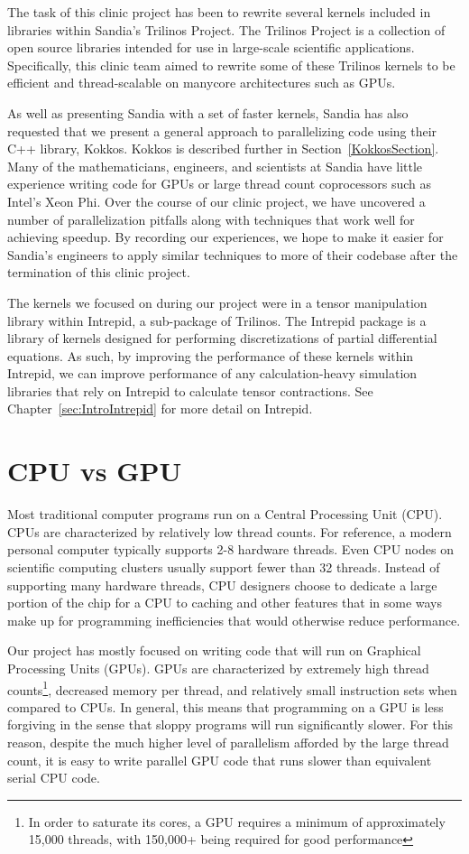 The task of this clinic project has been to rewrite several kernels included in
libraries within Sandia's Trilinos Project. The Trilinos Project is a
collection of open source libraries intended for use in large-scale scientific
applications. Specifically, this clinic team aimed to rewrite some of these Trilinos kernels to be
efficient and thread-scalable on manycore architectures such as GPUs.

As well as presenting Sandia with a set of faster kernels, Sandia has also
requested that we present a general approach to parallelizing code using their C++ library, Kokkos. Kokkos is described further in Section~\ref{KokkosSection}. Many of the
mathematicians, engineers, and scientists at Sandia have little experience
writing code for GPUs or large thread count coprocessors such as Intel's Xeon Phi. Over
the course of our clinic project, we have uncovered a number of parallelization pitfalls 
along with techniques that work well for achieving speedup. By recording our experiences, we hope to
make it easier for Sandia's engineers to apply similar techniques to more of
their codebase after the termination of this clinic project.

The kernels we focused on during our project were in a tensor manipulation
library within Intrepid, a sub-package of Trilinos. The Intrepid package is a
library of kernels designed for performing discretizations of partial
differential equations. As such, by improving the performance of these kernels
within Intrepid, we can improve performance of any calculation-heavy simulation
libraries that rely on Intrepid to calculate tensor contractions. See
Chapter~\ref{sec:IntroIntrepid} for more detail on Intrepid.

\section{CPU vs GPU} \label{CPU-GPU}

Most traditional computer programs run on a Central Processing Unit (CPU). CPUs
are characterized by relatively low thread counts. For reference, a modern personal computer
typically supports 2-8 hardware threads. Even CPU nodes on scientific computing clusters usually
support fewer than 32 threads. Instead of supporting many hardware threads, CPU designers 
choose to dedicate a large portion of the chip for a CPU to
caching and other features that in some ways make up for
programming inefficiencies that would otherwise reduce performance.

Our project has mostly focused on writing code that will run on Graphical
Processing Units (GPUs). GPUs are characterized by extremely high thread counts\footnote{
In order to saturate its cores, a GPU requires a minimum of approximately 15,000 threads, 
with 150,000+ being required for good performance},
decreased memory per thread, and relatively small instruction sets when compared
to CPUs. In general, this means that programming on a GPU is less forgiving in the 
sense that sloppy programs will run significantly slower. For this reason,
despite the much higher level of parallelism afforded by the large thread
count, it is easy to write parallel GPU code that runs slower than
equivalent serial CPU code.

